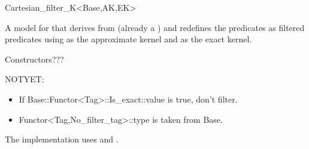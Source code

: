 \begin{ccRefClass}{Cartesian_filter_K<Base,AK,EK>}

\ccDefinition
A model for  that derives from  (already a
) and redefines the predicates as filtered predicates
using  as the approximate kernel and  as the exact
kernel.

\ccIsModel
{}

Constructors???

NOTYET:
\begin{itemize}
\item If Base::Functor<Tag>::Is_exact::value is true, don't filter.
\item Functor<Tag,No_filter_tag>::type is taken from Base.
\end{itemize}

\ccImplementation
The implementation uses  and
.

\end{ccRefClass}
